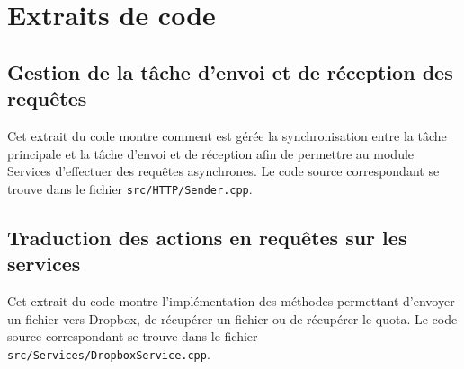 \chapter{Extraits de code}

\section{Gestion de la tâche d'envoi et de réception des requêtes}
\label{appendix:code-sender}

Cet extrait du code montre comment est gérée la synchronisation entre la tâche principale et la tâche d'envoi et de réception afin de permettre au module Services d'effectuer des requêtes asynchrones. Le code source correspondant se trouve dans le fichier \texttt{src/HTTP/Sender.cpp}.



\section{Traduction des actions en requêtes sur les services}
\label{appendix:code-service}

Cet extrait du code montre l'implémentation des méthodes permettant d'envoyer un fichier vers Dropbox, de récupérer un fichier ou de récupérer le quota. Le code source correspondant se trouve dans le fichier \texttt{src/Services/DropboxService.cpp}.



